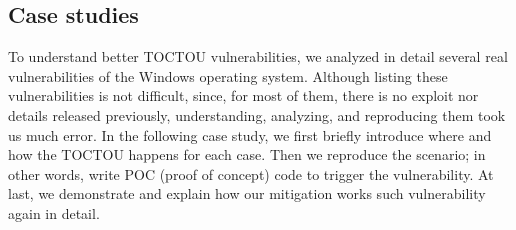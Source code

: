 \subsection{Case studies}
To understand better TOCTOU vulnerabilities, we analyzed in detail several real vulnerabilities of the Windows operating system. Although listing these vulnerabilities is not difficult, since, for most of them, there is no exploit nor details released previously, understanding, analyzing, and reproducing them took us much error. In the following case study, we first briefly introduce where and how the TOCTOU happens for each case. Then we reproduce the scenario; in other words, write POC (proof of concept) code to trigger the vulnerability. At last, we demonstrate and explain how our mitigation works such vulnerability again in detail.